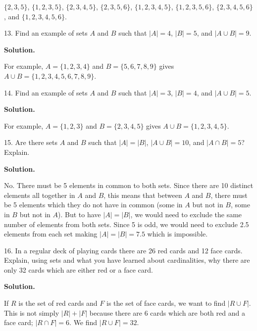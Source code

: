 \documentclass[10pt,]{book}
\theoremstyle{plain}
\theoremstyle{definition}
\theoremstyle{definition}
\theoremstyle{definition}
\numberwithin{equation}{section}
\begin{document}
\begin{exerciselist}
          \(\{2,3,5\}\), \(\{1,2,3,5\}\), \(\{2,3,4,5\}\), \(\{2,3,5,6\}\), \(\{1,2,3,4,5\}\), \(\{1,2,3,5,6\}\), \(\{2,3,4,5,6\}\), and \(\{1,2,3,4,5,6\}\).
\item[13.]\hypertarget{exercise-23}{}
          Find an example of sets \(A\) and \(B\) such that \(|A| = 4\), \(|B| = 5\), and \(|A \cup B| = 9\).
\par\smallskip
\par\smallskip
\noindent\textbf{Solution.}\hypertarget{solution-35}{}\quad

          For example, \(A = \{1,2,3,4\}\) and \(B = \{5,6,7,8,9\}\) gives \(A \cup B = \{1,2,3,4,5,6,7,8,9\}\).
\item[14.]\hypertarget{exercise-24}{}
          Find an example of sets \(A\) and \(B\) such that \(|A| = 3\), \(|B| = 4\), and \(|A \cup B| = 5\).
\par\smallskip
\par\smallskip
\noindent\textbf{Solution.}\hypertarget{solution-36}{}\quad

          For example, \(A = \{1,2,3\}\) and \(B = \{2,3,4,5\}\) gives \(A\cup B = \{1,2,3,4,5\}\).
\item[15.]\hypertarget{exercise-25}{}
          Are there sets \(A\) and \(B\) such that \(|A| = |B|\), \(|A\cup B| = 10\), and \(|A\cap B| = 5\)? Explain.
\par\smallskip
\par\smallskip
\noindent\textbf{Solution.}\hypertarget{solution-37}{}\quad

          No. There must be 5 elements in common to both sets. Since there are 10 distinct elements all together in \(A\) and \(B\), this means that between \(A\) and \(B\), there must be 5 elements which they do not have in common (some in \(A\) but not in \(B\), some in \(B\) but not in \(A\)). But to have \(|A| = |B|\), we would need to exclude the same number of elements from both sets.  Since 5 is odd, we would need to exclude 2.5 elements from each set making \(|A| = |B| = 7.5\) which is impossible.
\item[16.]\hypertarget{exercise-26}{}
          In a regular deck of playing cards there are 26 red cards and 12 face cards. Explain, using sets and what you have learned about cardinalities, why there are only 32 cards which are either red or a face card.
\par\smallskip
\par\smallskip
\noindent\textbf{Solution.}\hypertarget{solution-38}{}\quad

          If \(R\) is the set of red cards and \(F\) is the set of face cards, we want to find \(|R \cup F|\). This is not simply \(|R| + |F|\) because there are 6 cards which are both red and a face card; \(|R \cap F| = 6\). We find
          \(|R \cup F| = 32\).
\end{exerciselist}
\typeout{************************************************}
\typeout{************************************************}
\end{document}

